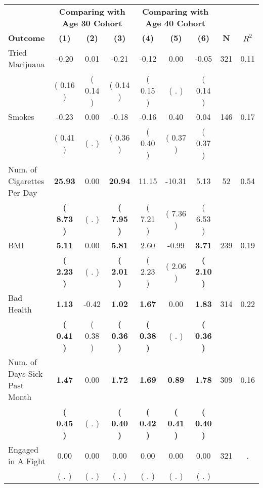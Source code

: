 \begin{tabular}{lcccccccc}
\toprule
 & \multicolumn{3}{c}{\textbf{Comparing with Age 30 Cohort}} & \multicolumn{3}{c}{\textbf{Comparing with Age 40 Cohort}} & \\
\cmidrule(lr){2-4} \cmidrule(lr){5-7} 
 \textbf{Outcome} & \textbf{(1)} & \textbf{(2)} & \textbf{(3)} & \textbf{(4)} & \textbf{(5)} & \textbf{(6)} & \textbf{N} & \textbf{$ R^2$} \\
\midrule
Tried Marijuana &     -0.20 &      0.01 &     -0.21 &     -0.12 &      0.00 &     -0.05 & 321 &       0.11 \\ 
 & (     0.16 ) & (     0.14 ) & (     0.14 ) & (     0.15 ) & (        . ) & (     0.14 ) & \\
Smokes &     -0.23 &      0.00 &     -0.18 &     -0.16 &      0.40 &      0.04 & 146 &       0.17 \\ 
 & (     0.41 ) & (        . ) & (     0.36 ) & (     0.40 ) & (     0.37 ) & (     0.37 ) & \\
Num. of Cigarettes Per Day & \textbf{    25.93} &      0.00 & \textbf{    20.94} &     11.15 &    -10.31 &      5.13 & 52 &       0.54 \\ 
 & \textbf{(     8.73 )} & (        . ) & \textbf{(     7.95 )} & (     7.21 ) & (     7.36 ) & (     6.53 ) & \\
BMI & \textbf{     5.11} &      0.00 & \textbf{     5.81} &      2.60 &     -0.99 & \textbf{     3.71} & 239 &       0.19 \\ 
 & \textbf{(     2.23 )} & (        . ) & \textbf{(     2.01 )} & (     2.23 ) & (     2.06 ) & \textbf{(     2.10 )} & \\
Bad Health & \textbf{     1.13} &     -0.42 & \textbf{     1.02} & \textbf{     1.67} &      0.00 & \textbf{     1.83} & 314 &       0.22 \\ 
 & \textbf{(     0.41 )} & (     0.38 ) & \textbf{(     0.36 )} & \textbf{(     0.38 )} & (        . ) & \textbf{(     0.36 )} & \\
Num. of Days Sick Past Month & \textbf{     1.47} &      0.00 & \textbf{     1.72} & \textbf{     1.69} & \textbf{     0.89} & \textbf{     1.78} & 309 &       0.16 \\ 
 & \textbf{(     0.45 )} & (        . ) & \textbf{(     0.40 )} & \textbf{(     0.42 )} & \textbf{(     0.41 )} & \textbf{(     0.40 )} & \\
Engaged in A Fight &      0.00 &      0.00 &      0.00 &      0.00 &      0.00 &      0.00 & 321 &          . \\ 
 & (        . ) & (        . ) & (        . ) & (        . ) & (        . ) & (        . ) & \\

\end{tabular}
